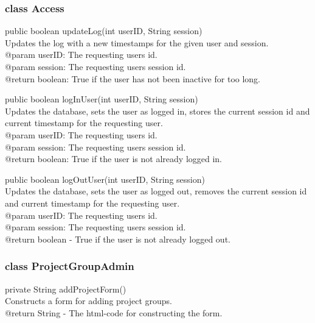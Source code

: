 \documentclass[a4paper]{article}
\begin{document}
\subsubsection{class Access}

\begin{hangparas}{1.5em}{1}
public boolean updateLog(int userID, String session)\\
Updates the log with a new timestamps for the given user and session. \\
@param userID: The requesting users id.\\
@param session: The requesting users session id.\\
@return boolean: True if the user has not been inactive for too long.
\end{hangparas}

\vspace{5mm}
\begin{hangparas}{1.5em}{1}
public boolean logInUser(int userID, String session)\\
Updates the database, sets the user as logged in, stores the current session id and current timestamp for the requesting user.\\
@param userID: The requesting users id.\\
@param session: The requesting users session id.\\
@return boolean: True if the user is not already logged in.
\end{hangparas}

\vspace{5mm}
\begin{hangparas}{1.5em}{1}
public boolean logOutUser(int userID, String session)\\
Updates the database, sets the user as logged out, removes the current session id and current timestamp for the requesting user.\\
@param userID: The requesting users id.\\
@param session: The requesting users session id.\\
@return boolean - True if the user is not already logged out.\\
\end{hangparas}

\subsubsection{class ProjectGroupAdmin}

\begin{hangparas}{1.5em}{1}
private String addProjectForm()\\
Constructs a form for adding project groups.\\
@return String - The html-code for constructing the form.
\end{hangparas}
\end{document}
